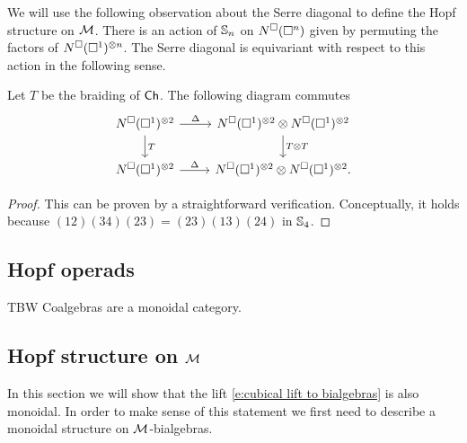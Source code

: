 We will use the following observation about the Serre diagonal to define the Hopf structure on $\M$.
There is an action of $\S_n$ on $\cchains(\square^n)$ given by permuting the factors of $\cchains(\square^1)^{\otimes n}$.
The Serre diagonal is equivariant with respect to this action in the following sense.

\begin{lemma} \label{l:serre diagonal invariant}
	Let $T$ be the braiding of $\Ch$.
	The following diagram commutes
	\begin{equation*}
	\begin{tikzcd}
	\cchains(\square^1)^{\otimes 2} \arrow[r, "\Delta"] \arrow[d, "T"] &
	\cchains(\square^1)^{\otimes 2} \otimes \cchains(\square^1)^{\otimes 2} \arrow[d, "T \otimes T"] \\
	\cchains(\square^1)^{\otimes 2} \arrow[r, "\Delta"] &
	\cchains(\square^1)^{\otimes 2} \otimes \cchains(\square^1)^{\otimes 2}.
	\end{tikzcd}
	\end{equation*}
\end{lemma}

\begin{proof}
	This can be proven by a straightforward verification. Conceptually, it holds because $(12)(34)(23) = (23)(13)(24)$ in $\S_4$.
\end{proof}

\subsection{Hopf operads}

TBW Coalgebras are a monoidal category.

\subsection{Hopf structure on $\M$}

In this section we will show that the lift \eqref{e:cubical lift to bialgebras} is also monoidal.
In order to make sense of this statement we first need to describe a monoidal structure on $\M$-bialgebras.

